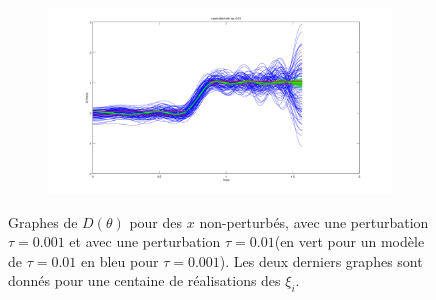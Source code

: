 \begin{figure}[h!]
\begin{subfigure}[b]{0.32\textwidth}
  \end{subfigure}
  \begin{subfigure}[b]{0.32\textwidth}
  \includegraphics[width=\textwidth]{D-ModRobustCon-tau001.png}
  \end{subfigure}
\caption{Graphes de $D(\theta)$ pour des $x$ non-perturbés, avec une perturbation $\tau=0.001$ et avec une perturbation $\tau = 0.01$(en vert pour un modèle de $\tau=0.01$ en bleu pour $\tau=0.001$). Les deux derniers graphes sont donnés pour une centaine de réalisations des $\xi_i$.}
  \label{fig:D-ModCon}

  \end{figure}
